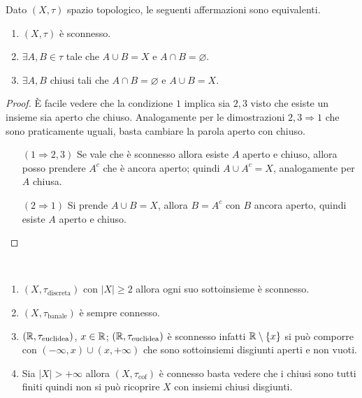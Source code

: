\begin{theorem}
	Dato $(X, \tau)$ spazio topologico, le seguenti affermazioni sono equivalenti. 
	\begin{enumerate}
		\item $(X, \tau)$ è sconnesso. 
		\item $\exists A, B \in \tau$ tale che $A \cup B = X$ e $A \cap B = \varnothing$.
		\item $\exists A, B$ chiusi tali che $A\cap B = \varnothing$ e $A \cup B = X$.
	\end{enumerate}
\end{theorem} 
\begin{proof}
	È facile vedere che la condizione $1$ implica sia $2,3$ visto che esiste un insieme sia aperto che chiuso. Analogamente per le dimostrazioni $2,3 \Rightarrow 1$ che sono praticamente uguali, basta cambiare la parola aperto con chiuso. 
	\begin{enumerate}
		\item[$(1\Rightarrow 2,3)$] Se vale che è sconnesso allora esiste $A$ aperto e chiuso, allora posso prendere $A^c$ che è ancora aperto; quindi $A\cup A^c = X$, analogamente per $A$ chiusa. 
		\item[$(2 \Rightarrow 1)$] Si prende $A \cup B = X$, allora $B = A^c$ con $B$ ancora aperto, quindi esiste $A$ aperto e chiuso. 
	\end{enumerate}
\end{proof}

\begin{example}\
\begin{enumerate}
	\item $(X, \tau_{\text{discreta}})$ con $|X| \ge 2$ allora ogni suo sottoinsieme è sconnesso. 
	\item $(X, \tau_{\text{banale}})$ è sempre connesso. 
	\item $(\mathbb{R}, \tau_{\text{euclidea}})$, $x \in \mathbb{R}$; $(\mathbb{R}, \tau_{\text{euclidea}})$ è sconnesso infatti $\mathbb{R} \setminus \left\{x\right\}$ si può comporre con $(-\infty, x) \cup (x, +\infty)$ che sono sottoinsiemi disgiunti aperti e non vuoti. 
	\item Sia $|X| > + \infty$ allora $(X, \tau_{\text{cof}})$ è connesso basta vedere che i chiusi sono tutti finiti quindi non si può ricoprire $X$ con insiemi chiusi disgiunti. 
\end{enumerate}
\end{example}

